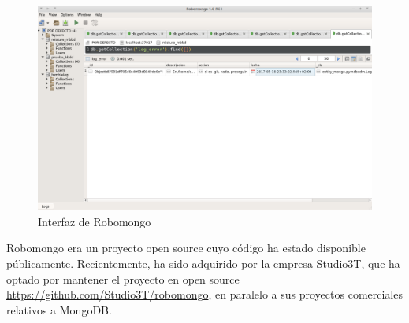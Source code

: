 \begin{figure}[H]
   \centering
   \includegraphics[width=16cm]{img/robomongo}
   \caption{Interfaz de Robomongo}
   \label{figura:robomongo}
\end{figure}


Robomongo era un proyecto open source cuyo código ha estado disponible públicamente. Recientemente, ha sido adquirido por la empresa Studio3T, que ha optado por mantener el proyecto en  open source \url{https://github.com/Studio3T/robomongo}, en paralelo a sus proyectos comerciales relativos a MongoDB.
